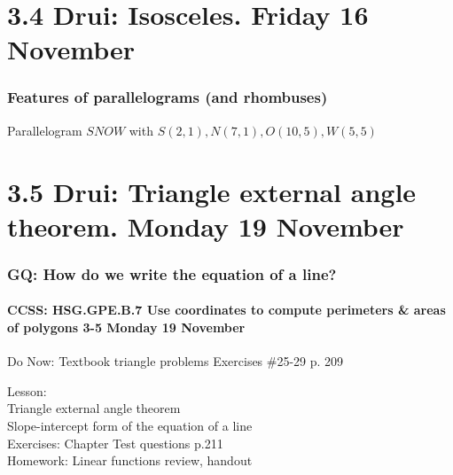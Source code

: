 \documentclass{beamer}
\begin{document}
    \section{3.4 Drui: Isosceles. Friday 16 November}
      \frame
      {
        \frametitle{Features of parallelograms (and rhombuses)}

      Parallelogram $SNOW$ with $S(2,1),N(7,1),O(10,5),W(5,5)$\\[0.5cm]
      }

    \section{3.5 Drui: Triangle external angle theorem. Monday 19 November}
      \frame
      {
        \frametitle{GQ: How do we write the equation of a line?}
        \framesubtitle{CCSS: HSG.GPE.B.7 Use coordinates to compute perimeters \& areas of polygons  \alert{3-5 Monday 19 November}}

        \begin{block}{Do Now: Textbook triangle problems}
          Exercises \#25-29 p. 209
        \end{block}
        Lesson: \\
        Triangle external angle theorem \\
        Slope-intercept form of the equation of a line\\
        Exercises: Chapter Test questions p.211 \\[0.5cm]
        Homework: Linear functions review, handout
      }
\end{document}
